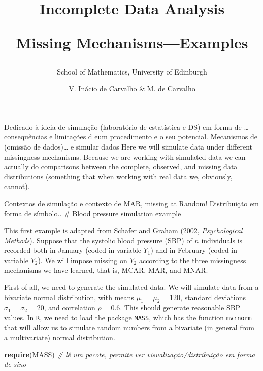 \documentclass[
]{article}
\title{Incomplete Data Analysis

Missing Mechanisms---Examples}
\subtitle{School of Mathematics, University of Edinburgh}
\author{V. Inácio de Carvalho \& M. de Carvalho}
\date{}
\newenvironment{Shaded}{\begin{snugshade}}{\end{snugshade}}
\newcommand{\CommentTok}[1]{\textcolor[rgb]{0.56,0.35,0.01}{\textit{#1}}}
\newcommand{\FunctionTok}[1]{\textcolor[rgb]{0.13,0.29,0.53}{\textbf{#1}}}
\newcommand{\NormalTok}[1]{#1}
\begin{document}
\maketitle

Dedicado à ideia de simulação (laboratório de estatística e DS) em forma
de \ldots{} consequências e limitações d eum procedimento e o seu
potencial. Mecanismos de (omissão de dados)\ldots{} e simular dados Here
we will simulate data under different missingness mechanisms. Because we
are working with simulated data we can actually do comparisons between
the complete, observed, and missing data distributions (something that
when working with real data we, obviously, cannot).

Contextos de simulação e contexto de MAR, missing at Random!
Distribuição em forma de símbolo.. \# Blood pressure simulation example

This first example is adapted from Schafer and Graham (2002,
\emph{Psychological Methods}). Suppose that the systolic blood pressure
(SBP) of \(n\) individuals is recorded both in January (coded in
variable \(Y_1\)) and in February (coded in variable \(Y_2\)). We will
impose missing on \(Y_2\) according to the three missingness mechanisms
we have learned, that is, MCAR, MAR, and MNAR.

First of all, we need to generate the simulated data. We will simulate
data from a bivariate normal distribution, with means
\(\mu_1=\mu_2=120\), standard deviations \(\sigma_1=\sigma_2=20\), and
correlation \(\rho=0.6\). This should generate reasonable SBP values. In
\texttt{R}, we need to load the package \texttt{MASS}, which has the
function \texttt{mvrnorm} that will allow us to simulate random numbers
from a bivariate (in general from a multivariate) normal distribution.

\begin{Shaded}
\begin{Highlighting}[]
\FunctionTok{require}\NormalTok{(MASS) }\CommentTok{\# lê um pacote, permite ver visualização/distribuição em forma de sino}
\end{Highlighting}
\end{Shaded}
\end{document}
